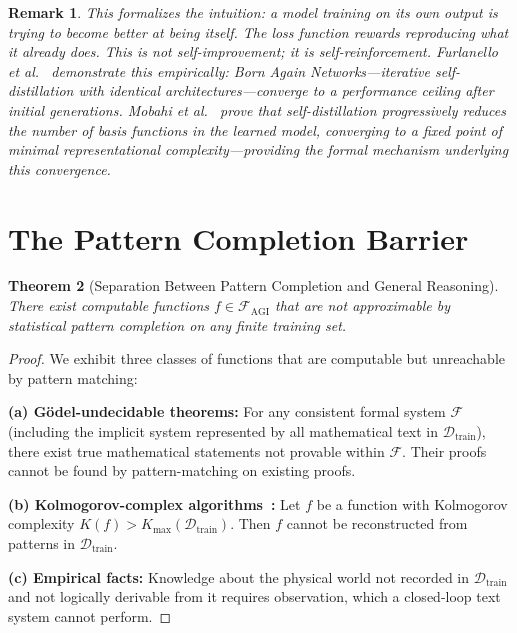 \documentclass[11pt,a4paper]{article}
\newtheorem{theorem}{Theorem}[section]
\newtheorem{remark}[theorem]{Remark}
\begin{document}
\begin{remark}
This formalizes the intuition: a model training on its own output is trying to become better at being itself. The loss function rewards reproducing what it already does. This is not self-improvement; it is self-reinforcement. Furlanello et al.~\cite{furlanello2018born} demonstrate this empirically: Born Again Networks---iterative self-distillation with identical architectures---converge to a performance ceiling after initial generations. Mobahi et al.~\cite{mobahi2020selfdistillation} prove that self-distillation progressively reduces the number of basis functions in the learned model, converging to a fixed point of minimal representational complexity---providing the formal mechanism underlying this convergence.
\end{remark}

\section{The Pattern Completion Barrier}

\begin{theorem}[Separation Between Pattern Completion and General Reasoning]
\label{thm:separation}
There exist computable functions $f \in \mathcal{F}_{\mathrm{AGI}}$ that are not approximable by statistical pattern completion on any finite training set.
\end{theorem}

\begin{proof}
We exhibit three classes of functions that are computable but unreachable by pattern matching:

\textbf{(a) G\"{o}del-undecidable theorems:} For any consistent formal system $\mathcal{F}$ (including the implicit system represented by all mathematical text in $\mathcal{D}_{\mathrm{train}}$), there exist true mathematical statements not provable within $\mathcal{F}$. Their proofs cannot be found by pattern-matching on existing proofs.

\textbf{(b) Kolmogorov-complex algorithms~\cite{kolmogorov1965}:} Let $f$ be a function with Kolmogorov complexity $K(f) > K_{\max}(\mathcal{D}_{\mathrm{train}})$. Then $f$ cannot be reconstructed from patterns in $\mathcal{D}_{\mathrm{train}}$.

\textbf{(c) Empirical facts:} Knowledge about the physical world not recorded in $\mathcal{D}_{\mathrm{train}}$ and not logically derivable from it requires observation, which a closed-loop text system cannot perform.
\end{proof}
\end{document}
